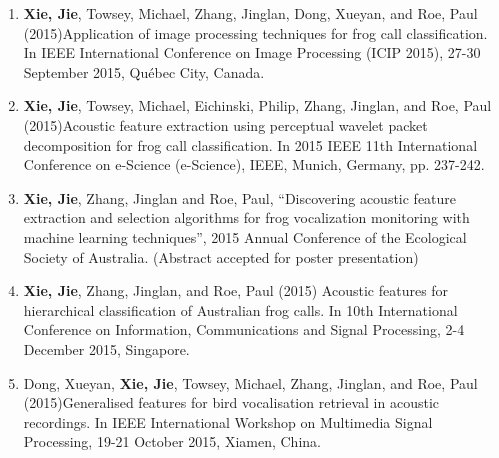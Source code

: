 \begin{enumerate}
\item	\textbf{Xie, Jie}, Towsey, Michael, Zhang, Jinglan, Dong, Xueyan, and Roe, Paul (2015)Application of image processing techniques for frog call classification. In IEEE International Conference on Image Processing (ICIP 2015), 27-30 September 2015, Québec City, Canada.

\item	\textbf{Xie, Jie}, Towsey, Michael, Eichinski, Philip, Zhang, Jinglan, and Roe, Paul (2015)Acoustic feature extraction using perceptual wavelet packet decomposition for frog call classification. In 2015 IEEE 11th International Conference on e-Science (e-Science), IEEE, Munich, Germany, pp. 237-242.

\item	\textbf{Xie, Jie}, Zhang, Jinglan and Roe, Paul,  “Discovering acoustic feature extraction and selection algorithms for frog vocalization monitoring with machine learning techniques”, 2015 Annual Conference of the Ecological Society of Australia. (Abstract accepted for poster presentation) 

\item	\textbf{Xie, Jie}, Zhang, Jinglan, and Roe, Paul (2015) Acoustic features for hierarchical classification of Australian frog calls. In 10th International Conference on Information, Communications and Signal Processing, 2-4 December 2015, Singapore.

\item	Dong, Xueyan, \textbf{Xie, Jie}, Towsey, Michael, Zhang, Jinglan, and Roe, Paul (2015)Generalised features for bird vocalisation retrieval in acoustic recordings. In IEEE International Workshop on Multimedia Signal Processing, 19-21 October 2015, Xiamen, China.

\end{enumerate} 
%
